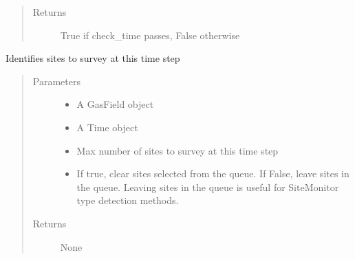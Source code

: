 \documentclass[letterpaper,10pt,english]{sphinxmanual}
\begin{document}
\begin{fulllineitems}
\begin{fulllineitems}
\begin{quote}
\begin{description}
\item[{Returns}] \leavevmode
True if check\_time passes, False otherwise

\end{description}\end{quote}

\end{fulllineitems}


\begin{fulllineitems}
\label{\detokenize{index:feast.DetectionModules.abstract_detection_method.DetectionMethod.choose_sites}}
Identifies sites to survey at this time step
\begin{quote}\begin{description}
\item[{Parameters}] \leavevmode\begin{itemize}
\item {} 
 \textendash{} A GasField object

\item {} 
 \textendash{} A Time object

\item {} 
 \textendash{} Max number of sites to survey at this time step

\item {} 
 \textendash{} If true, clear sites selected from the queue. If False, leave sites in the queue.
Leaving sites in the queue is useful for SiteMonitor type detection methods.

\end{itemize}

\item[{Returns}] \leavevmode
None

\end{description}\end{quote}

\end{fulllineitems}



\end{fulllineitems}
\end{document}
